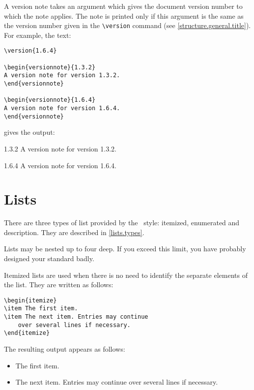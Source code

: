 A version note takes an argument which gives the document version number to
which the note applies.
The note is printed only if this argument is the same as the version number
given in the
\verb|\version| command (see \ref{structure.general.title}).
For example, the text:
\begin{verbatim}
\version{1.6.4}

\begin{versionnote}{1.3.2}
A version note for version 1.3.2.
\end{versionnote}

\begin{versionnote}{1.6.4}
A version note for version 1.6.4.
\end{versionnote}
\end{verbatim}
gives the output:
\begin{versionnote}{1.3.2}
A version note for version 1.3.2.
\end{versionnote}

\begin{versionnote}{1.6.4}
A version note for version 1.6.4.
\end{versionnote}

\section{Lists}
There are three types of list provided by the \iso\ style: itemized,
enumerated and description.
They are described in \ref{lists.types}.

Lists may be nested up to four deep.
If you exceed this limit, you have probably designed your standard badly.

\label{lists.types}
Itemized lists are used when there is no need to identify the separate
elements of the list.
They are written as follows:
\begin{verbatim}
\begin{itemize}
\item The first item.
\item The next item. Entries may continue
    over several lines if necessary.
\end{itemize}
\end{verbatim}
The resulting output appears as follows:
\begin{itemize}
\item The first item.
\item The next item. Entries may continue
    over several lines if necessary.
\end{itemize}

